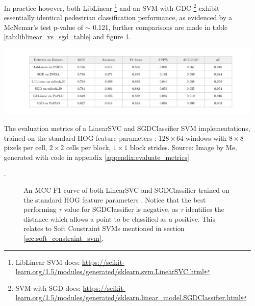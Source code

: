 In practice however, both LibLinear \footnote{LibLinear SVM docs: \url{https://scikit-learn.org/1.5/modules/generated/sklearn.svm.LinearSVC.html}} and an SVM with GDC \footnote{SVM with SGD docs: \url{https://scikit-learn.org/1.5/modules/generated/sklearn.linear_model.SGDClassifier.html}} exhibit essentially identical pedestrian classification performance, as evidenced by a McNemar's test p-value of $\sim$ 0.121, further comparisons are made in table \ref{tab:liblinear_vs_sgd_table} and figure \ref{fig:liblinear_vs_sgd_curve}.

\begin{table}
    \includegraphics[width=\linewidth]{images/liblinear_vs_sgd_table.png}
    \caption{The evaluation metrics of a LinearSVC and SGDClassifier SVM implementations, trained on the standard HOG feature parameters \cite{dalal_2005_histograms}: $128\times64$ windows with $8\times8$ pixels per cell, $2\times2$ cells per block, $1\times1$ block strides. Source: Image by Me, generated with code in appendix \ref{appendix:evaluate_metrics}}
    \label{tab:liblinear_vs_sgd_table}. 
\end{table}


\begin{figure}
    \centering
    
    \caption{An MCC-F1 curve of both LinearSVC and SGDClassifier trained on the standard HOG feature parameters \cite{dalal_2005_histograms}. Notice that the best performing $\tau$ value for SGDClassifier is negative, as $\tau$ identifies the distance which allows a point to be classified as a positive. This relates to Soft Constraint SVMs mentioned in section \ref{sec:soft_constraint_svm}.}
    \label{fig:liblinear_vs_sgd_curve}
\end{figure}



